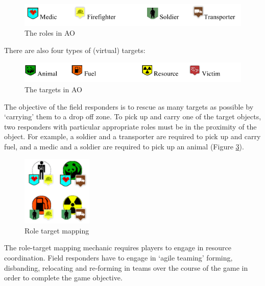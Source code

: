 \begin{figure}[h]
  \centering
  \includegraphics[width=1\textwidth]{img/approach/AOroles}
  \caption{The roles in \ac{AO}}
  \label{fig:AOroles}
\end{figure}

There are also four types of (virtual) targets:\\

\begin{figure}[h]
  \centering
  \includegraphics[width=1\textwidth]{img/approach/AOtargets}
  \caption{The targets in \ac{AO}}
  \label{fig:AOtargets}
\end{figure}

The objective of the field responders is to rescue as many targets as possible by `carrying' them to a drop off zone. To pick up and carry one of the target objects, two responders with particular appropriate roles must be in the proximity of the object. For example, a soldier and a transporter are required to pick up and carry fuel, and a medic and a soldier are required to pick up an animal (Figure \ref{fig:roleTargetMapping}).\\

\begin{figure}[h]
  \centering
  \includegraphics[width=0.3\textwidth]{img/approach/roleTargetMapping}
  \caption{Role target mapping}
  \label{fig:roleTargetMapping}
\end{figure}

The role-target mapping mechanic requires players to engage in resource coordination. Field responders have to engage in `agile teaming' forming, disbanding, relocating and re-forming in teams over the course of the game in order to complete the game objective. \\

